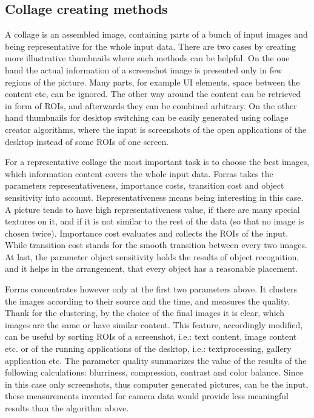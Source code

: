 \documentclass[draft,final]{vutinfth} %
\begin{document}
\subsection{Collage creating methods} 
A collage is an assembled image, containing parts of a bunch of input images and being representative for the whole input data.
There are two cases by creating  more illustrative thumbnails where such methods can be helpful.
On the one hand the actual information of a screenshot image is presented only in few regions of the picture.
Many parts, for example UI elements, space between the content etc, can be ignored. 
The other way around the content can be retrieved in form of ROIs, and afterwards they can be combined arbitrary.
On the other hand thumbnails for desktop switching can be easily generated using collage creator algorithms, where the input is screenshots of the open applications of the desktop instead of some ROIs of one screen.\par
For a representative collage the most important task is to choose the best images, which information content covers the whole input data.
Forras takes the parameters representativeness, importance costs, transition cost and object sensitivity into account.
Representativeness means being interesting in this case.
A picture tends to have high representativeness value, if there are many special textures on it, and if it is not similar to the rest of the data (so that no image is chosen twice).
Importance cost evaluates and collects the ROIs of the input.
While transition cost stands for the smooth transition between every two images.
At last, the parameter object sensitivity holds the results of object recognition, and it helps in the arrangement, that every object has a reasonable placement.\par
Forras concentrates however only at the first two parameters above.
It clusters the images according to their source and the time, and measures the quality.
Thank for the clustering, by the choice of the final images it is clear,  which images are the same or have similar content.
This feature, accordingly modified, can be useful by sorting ROIs of a screenshot, i.e.: text content, image content etc. or of the running applications of the desktop, i.e.: textprocessing, gallery application etc.
The parameter quality summarizes the value of the results of the following calculations: blurriness, compression, contrast and color balance.
Since in this case only screenshots, thus computer generated pictures, can be the input, these measurements invented for camera data would provide less meaningful results than the algorithm above.\par 
\end{document}
